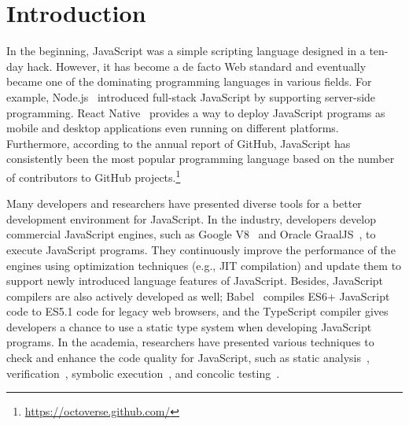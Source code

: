 \section{Introduction}\label{sec:intro}

In the beginning, JavaScript was a simple scripting language designed in a
ten-day hack. However, it has become a de facto Web standard and eventually
became one of the dominating programming languages in various fields. For
example, Node.js~\cite{nodejs} introduced full-stack JavaScript by supporting
server-side programming.  React Native~\cite{react-native} provides a way to
deploy JavaScript programs as mobile and desktop applications even running on
different platforms.  Furthermore, according to the annual report of GitHub,
JavaScript has consistently been the most popular programming language based on
the number of contributors to GitHub
projects.\footnote{\url{https://octoverse.github.com/}}

Many developers and researchers have presented diverse tools for a better
development environment for JavaScript. In the industry, developers develop
commercial JavaScript engines, such as Google V8~\cite{v8} and Oracle
GraalJS~\cite{graaljs}, to execute JavaScript programs.  They continuously
improve the performance of the engines using optimization techniques (e.g., JIT
compilation) and update them to support newly introduced language features of
JavaScript.  Besides, JavaScript compilers are also actively developed as well;
Babel~\cite{babel} compiles ES6+ JavaScript code to ES5.1 code for legacy web
browsers, and the TypeScript compiler gives developers a chance to use a static
type system when developing JavaScript programs.  In the academia, researchers
have presented various techniques to check and enhance the code quality for
JavaScript, such as static analysis~\cite{safe, safe2, tajs, wala, jsai},
verification~\cite{javert, javert2, ad-safety, javanni}, symbolic
execution~\cite{symbolic-js, sym-js, expo-se}, and concolic
testing~\cite{jalangi, type-conc-test}.

